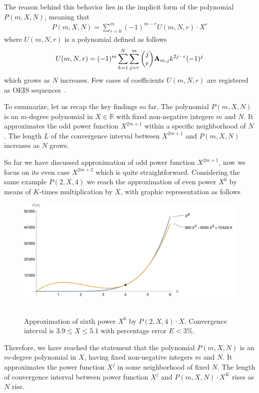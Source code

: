 The reason behind this behavior lies in the implicit form of the polynomial $P(m,X,N)$,
meaning that
\begin{align*}
    P(m,X,N) = \sum_{r=0}^{m} (-1)^{m-r} U(m, N, r) \cdot X^{r}
\end{align*}
where $U(m, N, r)$ is a polynomial defined as follows
\begin{align*}
    U(m, N, r) = (-1)^m \sum_{k=1}^{N} \sum_{j=r}^{m} \binom{j}{r} {\mathbf{A}} \sb{m,j} k^{2j-r} (-1)^j
\end{align*}
which grows as $N$ increases.
Few cases of coefficients $U(m, N, r)$ are registered as OEIS sequences~\cite{
    oeis_coefficients_u_m_l_k_defined_by_polynomial_identity_1,
    oeis_coefficients_u_m_l_k_defined_by_polynomial_identity_2,
    oeis_coefficients_u_m_l_k_defined_by_polynomial_identity_3}.

To summarize, let us recap the key findings so far.
The polynomial $P(m,X,N)$ is an $m$-degree polynomial in $X \in \mathbb{R}$ with fixed non-negative integers $m$ and $N$.
It approximates the odd power function $X^{2m+1}$ within a specific neighborhood of $N$.
The length $L$ of the convergence interval between $X^{2m+1}$ and $P(m,X,N)$ increases as $N$ grows.


So far we have discussed approximation of odd power function $X^{2m+1}$, now we focus on its even case $X^{2m+2}$
which is quite straightforward.
Considering the same example $P(2, X, 4)$ we reach the approximation of even power $X^6$
by means of $K$-times multiplication by $X$, with graphic representation as follows
\begin{figure}[H]
    \centering
    \includegraphics[width=1\textwidth]{sections/images/07_plot_of_6th_power_with_p_2_4_times_x}
    ~\caption{Approximation of sixth power $X^6$ by $P(2, X, 4) \cdot X$.
    Convergence interval is $3.9 \leq X \leq 5.1$ with percentage error $E < 3\%$.
    }\label{fig:07_plot_of_6th_power_with_p_2_4_times_x}
\end{figure}
Therefore, we have reached the statement that
the polynomial $P(m,X,N)$ is an $m$-degree polynomial in $X$, having fixed non-negative
integers $m$ and $N$.
It approximates the power function $X^{j}$ in some neighborhood of fixed $N$.
The length of convergence interval between power function $X^j$ and $P(m,X,N) \cdot X^K$ rises as $N$ rise.

